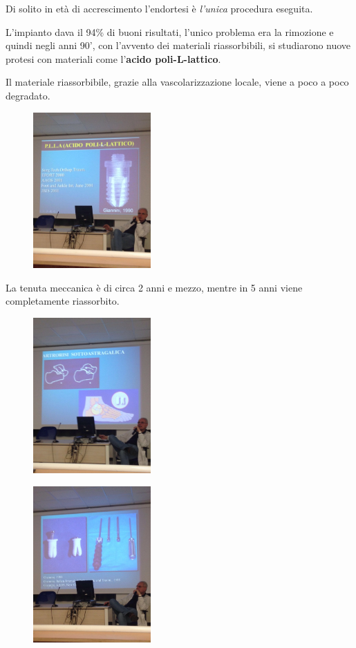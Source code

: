 Di solito in età di accrescimento l'endortesi è \emph{l'unica} procedura eseguita.

L'impianto dava il 94\% di buoni risultati, l'unico problema era la rimozione e quindi negli anni 90', con l'avvento dei materiali riassorbibili, si studiarono nuove protesi con materiali come l'\textbf{acido poli-L-lattico}.

Il materiale riassorbibile, grazie alla vascolarizzazione locale, viene a poco a poco degradato.

\begin{figure}[!ht]
\centering
\includegraphics[width=0.4\textwidth]{015/image7.jpeg}
\end{figure}

La tenuta meccanica è di circa 2 anni e mezzo, mentre in 5 anni viene completamente riassorbito.

\begin{figure}[!ht]
\centering
\includegraphics[width=0.4\textwidth]{015/image8.jpeg}
\end{figure}

\begin{figure}[!ht]
\centering
\includegraphics[width=0.4\textwidth]{015/image9.jpeg}
\end{figure}


